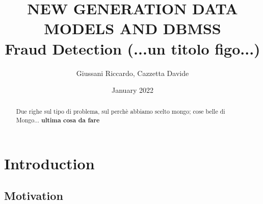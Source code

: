 \documentclass[letterpaper,11pt]{article}
\begin{document}
\title{NEW GENERATION DATA MODELS AND DBMSS \\\textbf{Fraud Detection (...un titolo figo...)}}
\author{Giussani Riccardo, Cazzetta Davide}
\date{January 2022}
\maketitle

\begin{abstract}
Due righe sul tipo di problema, sul perchè abbiamo scelto mongo; cose belle di Mongo... 
\textbf{ultima cosa da fare}
\end{abstract}

\section{Introduction}
\subsection{Motivation}
\end{document}
